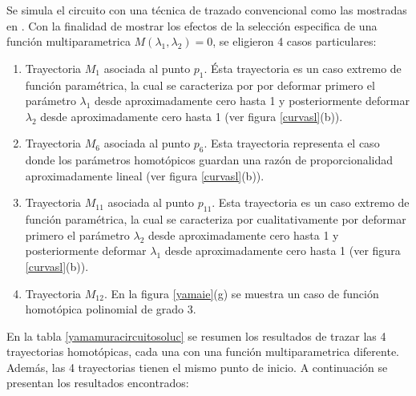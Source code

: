 \documentclass[conference,letterpaper,twocolumn]{IEEEtran}
\begin{document}
Se simula el circuito con una técnica de trazado convencional como las mostradas en \cite{homo_allgower,homo_iberchip03}.
Con la finalidad de mostrar los efectos de la selección especifica de una función multiparametrica $M(\lambda_1,\lambda_2)=0$, se eligieron
4 casos particulares:

\begin{enumerate}
\item Trayectoria $M_1$ asociada al punto  $p_1$. Ésta trayectoria es un caso extremo de función paramétrica, la cual se caracteriza por 
por deformar primero el parámetro $\lambda_1$ desde aproximadamente cero hasta 1 y posteriormente deformar $\lambda_2$ desde aproximadamente cero hasta 1 (ver figura \ref{curvasl}(b)).
\item Trayectoria $M_6$  asociada al punto  $p_6$. Esta trayectoria representa el caso donde los parámetros homotópicos guardan una razón de proporcionalidad
aproximadamente lineal (ver figura \ref{curvasl}(b)).
\item Trayectoria $M_{11}$  asociada al punto  $p_{11}$. Esta trayectoria es un caso extremo de función paramétrica, la cual se caracteriza por cualitativamente
por deformar primero el parámetro $\lambda_2$ desde aproximadamente cero hasta 1 y posteriormente deformar $\lambda_1$ desde aproximadamente cero hasta 1 (ver figura \ref{curvasl}(b)).
\item Trayectoria $M_{12}$. En la figura \ref{yamaie}(g) se muestra un caso de función homotópica polinomial de grado 3.
\end{enumerate}

En la tabla \ref{yamamuracircuitosoluc} se resumen los resultados de trazar las 4 trayectorias homotópicas, cada una
con una función  multiparametrica diferente. Además, las 4 trayectorias tienen el mismo punto de inicio. A continuación
se presentan los resultados encontrados:
\end{document}
